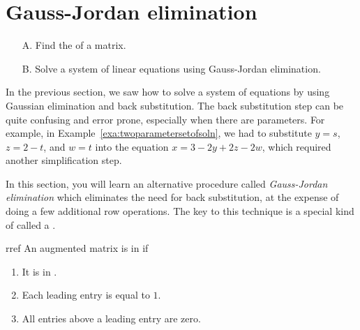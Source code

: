 \section{Gauss-Jordan elimination}

\begin{outcome}
  \begin{enumerate}
  \item[A.] Find the {\rref} of a matrix.
    
  \item[B.] Solve a system of linear equations using Gauss-Jordan elimination.
  \end{enumerate}
\end{outcome}

In the previous section, we saw how to solve a system of equations by
using Gaussian elimination and back substitution. The back
substitution step can be quite confusing and error prone, especially
when there are parameters. For example, in
Example~\ref{exa:twoparametersetofsoln}, we had to substitute $y=s$,
$z=2-t$, and $w=t$ into the equation $x=3-2y+2z-2w$, which required
another simplification step.

In this section, you will learn an alternative procedure called {\em
  Gauss-Jordan elimination} which eliminates the need for back
substitution, at the expense of doing a few additional row operations.
The key to this technique is a special kind of {\ef} called a
{\em {\rref}}.

\begin{definition}{\Rref}{rref}
  An augmented matrix is in \textbf{\rref}\eindex{\rref} if
  
  \begin{enumerate}
  \item It is in {\ef}.
    
  \item Each leading entry is equal to $1$.
    
  \item All entries above a leading entry are zero.
  \end{enumerate}
\end{definition}

